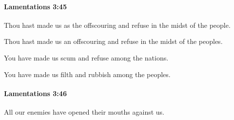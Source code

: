 		\paragraph{Lamentations 3:45} %
			\label{LAMENTATIONS-3-45}

			Thou hast made us as the offscouring and refuse in the midst of the people.

			\begin{versebox}
					\item[BHS] 
					\item[LXX] 
					\item[ASV] Thou hast made us an offscouring and refuse in the midst of the peoples.
					\item[NIV] You have made us scum and refuse among the nations.
					\item[NRSV] You have made us filth and rubbish among the peoples.
			\end{versebox}

		\paragraph{Lamentations 3:46} %
			\label{LAMENTATIONS-3-46}

			All our enemies have opened their mouths against us.

